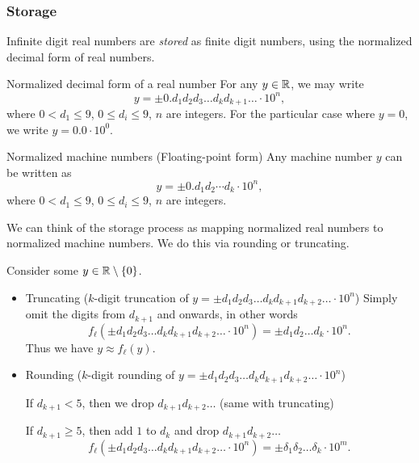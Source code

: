 \documentclass[class=article, crop=false]{standalone}
\begin{document}
  \subsubsection{Storage}
  Infinite digit real numbers are \emph{stored} as finite digit numbers, using the normalized decimal form of real numbers.
  \begin{definition}{Normalized decimal form of a real number}
    For any $y\in\mathbb{R}$, we may write
    \[
      y = \pm 0.d_1d_2d_3\dotsc d_kd_{k + 1}\dotsc\cdot 10^n,
    \]
    where $0 < d_1\leq 9$, $0\leq d_i\leq 9$, $n$ are integers. For the particular case where $y = 0$, we write $y = 0.0\cdot 10^0$.
  \end{definition}
  \begin{definition}{Normalized machine numbers (Floating-point form)}
    Any machine number $y$ can be written as
    \[
      y = \pm 0.d_1d_2\dotsb d_k\cdot 10^n,
    \]
    where $0 < d_1\leq 9$, $0\leq d_i\leq 9$, $n$ are integers.
  \end{definition}
  We can think of the storage process as mapping normalized real numbers to normalized machine numbers. We do this via rounding or truncating. \par
  Consider some $y\in\mathbb{R}\setminus \left\{0\right\}$.
  \begin{itemize}
    \item Truncating ($k$-digit truncation of $y = \pm d_1d_2d_3\dotsc d_kd_{k + 1}d_{k + 2}\dotsc\cdot 10^n$)
    Simply omit the digits from $d_{k + 1}$ and onwards, in other words
    \[
      f_\ell(\pm d_1d_2d_3\dotsc d_kd_{k + 1}d_{k + 2}\dotsc\cdot 10^n) = \pm d_1d_2\dotsc d_k\cdot 10^n.
    \]
    Thus we have $y\approx f_\ell(y)$.
    \item Rounding ($k$-digit rounding of $y = \pm d_1d_2d_3\dotsc d_kd_{k + 1}d_{k + 2}\dotsc\cdot 10^n$) \par
    If $d_{k + 1} < 5$, then we drop $d_{k + 1}d_{k + 2}\dotsc$ (same with truncating) \par
    If $d_{k + 1} \geq 5$, then add $1$ to $d_k$ and drop $d_{k + 1}d_{k + 2}\dotsc$
    \[
      f_\ell(\pm d_1d_2d_3\dotsc d_kd_{k + 1}d_{k + 2}\dotsc\cdot 10^n) = \pm \delta_1\delta_2\dotsc \delta_k\cdot 10^m.
    \]
  \end{itemize}
\end{document}
